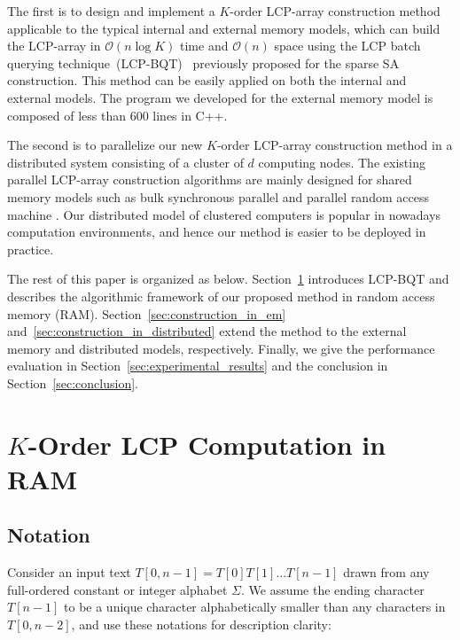 \documentclass{llncs}
\begin{document}
The first is to design and implement a $K$-order LCP-array construction method applicable to the typical internal and external memory models, which can build the LCP-array in $\mathcal{O}(n\log K)$ time and $\mathcal{O}(n)$ space using the LCP batch querying technique~(LCP-BQT)~\cite{Philip2013} previously proposed for the sparse SA construction. This method can be easily applied on both the internal and external models. The program we developed for the external memory model is composed of less than 600 lines in C++.

The second is to parallelize our new $K$-order LCP-array construction method in a distributed system consisting of a cluster of $d$ computing nodes. The existing parallel LCP-array construction algorithms are mainly designed for shared memory models such as bulk synchronous parallel and parallel random access machine \cite{Shun2014,Deo2013}. Our distributed model of clustered computers is popular in nowadays computation environments, and hence our method is easier to be deployed in practice.

The rest of this paper is organized as below. Section~\ref{sec:construction_in_ram} introduces LCP-BQT and describes the algorithmic framework of our proposed method in random access memory (RAM). Section~\ref{sec:construction_in_em} and~\ref{sec:construction_in_distributed} extend the method to the external memory and distributed models, respectively. Finally, we give the performance evaluation in Section~\ref{sec:experimental_results} and the conclusion in Section~\ref{sec:conclusion}.

\section{$K$-Order LCP Computation in RAM}\label{sec:construction_in_ram}

\subsection{Notation}\label{subsec:basic_notations}

Consider an input text $T[0,n-1] =T[0]T[1]...T[n-1]$ drawn from any full-ordered constant or integer alphabet $\Sigma$. We assume the ending character $T[n-1]$ to be a unique character alphabetically smaller than any characters in $T[0,n-2]$, and use these notations for description clarity:
\end{document}
